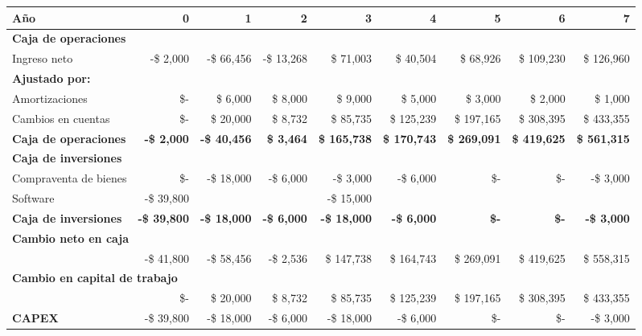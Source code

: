 \begin{center}
\footnotesize
\begin{adjustbox}{width=\textwidth,center}
\begin{tabular}{l|rrrrrrrr}
\hline
\textbf{Año} & \textbf{0} & \textbf{1} & \textbf{2} & \textbf{3} & \textbf{4} & \textbf{5} & \textbf{6} & \textbf{7} \\
\hline
\multicolumn{9}{l}{\textbf{Caja de operaciones}} \\
\hline
Ingreso neto & -\$ 2,000 & -\$ 66,456 & -\$ 13,268 & \$ 71,003 & \$ 40,504 & \$ 68,926 & \$ 109,230 & \$ 126,960 \\
\hline
\multicolumn{9}{l}{\textbf{Ajustado por:}} \\
\hline
Amortizaciones & \$- & \$ 6,000 & \$ 8,000 & \$ 9,000 & \$ 5,000 & \$ 3,000 & \$ 2,000 & \$ 1,000 \\
Cambios en cuentas & \$- & \$ 20,000 & \$ 8,732 & \$ 85,735 & \$ 125,239 & \$ 197,165 & \$ 308,395 & \$ 433,355 \\
\hline
\textbf{Caja de operaciones} & \textbf{-\$ 2,000} & \textbf{-\$ 40,456} & \textbf{\$ 3,464} & \textbf{\$ 165,738} & \textbf{\$ 170,743} & \textbf{\$ 269,091} & \textbf{\$ 419,625} & \textbf{\$ 561,315} \\
\hline
\hline
\multicolumn{9}{l}{\textbf{Caja de inversiones}} \\
\hline
Compraventa de bienes & \$- & -\$ 18,000 & -\$ 6,000 & -\$ 3,000 & -\$ 6,000 & \$- & \$- & -\$ 3,000 \\
Software & -\$ 39,800 & & & -\$ 15,000 & & & & \\
\hline
\textbf{Caja de inversiones} & \textbf{-\$ 39,800} & \textbf{-\$ 18,000} & \textbf{-\$ 6,000} & \textbf{-\$ 18,000} & \textbf{-\$ 6,000} & \textbf{\$-} & \textbf{\$-} & \textbf{-\$ 3,000} \\
\hline
\hline
\multicolumn{9}{l}{\textbf{Cambio neto en caja}} \\
\hline
& -\$ 41,800 & -\$ 58,456 & -\$ 2,536 & \$ 147,738 & \$ 164,743 & \$ 269,091 & \$ 419,625 & \$ 558,315 \\
\hline
\hline
\multicolumn{9}{l}{\textbf{Cambio en capital de trabajo}} \\
\hline
& \$- & \$ 20,000 & \$ 8,732 & \$ 85,735 & \$ 125,239 & \$ 197,165 & \$ 308,395 & \$ 433,355 \\
\hline
\textbf{CAPEX} & -\$ 39,800 & -\$ 18,000 & -\$ 6,000 & -\$ 18,000 & -\$ 6,000 & \$- & \$- & -\$ 3,000 \\
\hline
\end{tabular}
\end{adjustbox}
\end{center}




